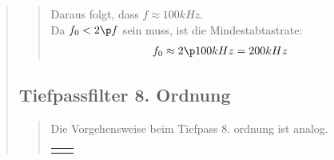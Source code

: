 \begin{quote}
\begin{quote}
        \vspace{1.5 cm}    
        Daraus folgt, dass $f \approx 100 kHz$.\\
        Da $f_0 < 2 \p f$ sein muss, ist die Mindestabtastrate:\\
         
        \begin{equation}
    	\begin{split}
            f_0 \approx 2 \p 100 kHz = 200 kHz
    	\end{split}
        \end{equation}
    \end{quote}




    \subsection{Tiefpassfilter 8. Ordnung}
    \begin{quote}
        
        Die Vorgehensweise beim Tiefpass 8. ordnung ist analog.
        
        
        \begin{center}
        \vspace{-1.5cm}
                
        \end{center}
        \begin{tabular}{ll}
        
        \hspace{-4.5cm}
            \begin{minipage}{0.6\textwidth}
                

\end{minipage}
\end{tabular}
\end{quote}
\end{quote}

